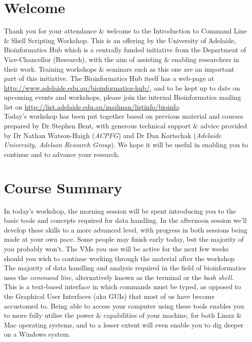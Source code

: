 %
%
\newpage
\section{Welcome}
Thank you for your attendance \& welcome to the Introduction to Command Line \& Shell Scripting Workshop.
This is an offering by the University of Adelaide, Bioinformatics Hub which is a centrally funded initiative from the Department of Vice-Chancellor (Research), with the aim of assisting \& enabling researchers in their work.
Training workshops \& seminars such as this one  are an important part of this initiative. 
The Bioinformatics Hub itself has a web-page at \url{http://www.adelaide.edu.au/bioinformatics-hub/}, and to be kept up to date on upcoming events and workshops, please join the internal Bioinformatics mailing list on \url{http://list.adelaide.edu.au/mailman/listinfo/bioinfo}.\\

Today's workshop has been put together based on previous material and courses prepared by Dr Stephen Bent, with generous technical support \& advice provided by Dr Nathan Watson-Haigh (\textit{ACPFG}) and Dr Dan Kortschak (\textit{Adelaide University, Adelson Research Group}). 
We hope it will be useful in enabling you to continue and to advance your research.\\

\section{Course Summary}
In today's workshop, the morning session will be spent introducing you to the basic tools and concepts required for data handling.
In the afternoon session we'll develop these skills to a more advanced level, with progress in both sessions being made at your own pace.
Some people may finish early today, but the majority of you probably won't.
The VMs you use will be active for the next few weeks should you wish to continue working through the material after the workshop \\

The majority of data handling and analysis required in the field of bioinformatics uses the \textit{command line}, alternatively known as the terminal or the \textit{bash shell}.
This is a text-based interface in which commands must be typed, as opposed to the Graphical User Interfaces (aka GUIs) that most of us have become accustomed to.
Being able to access your computer using these tools enables you to more fully utilise the power \& capabilities of your machine, for both Linux \& Mac operating systems, and to a lesser extent will even enable you to dig deeper on a Windows system.\\

